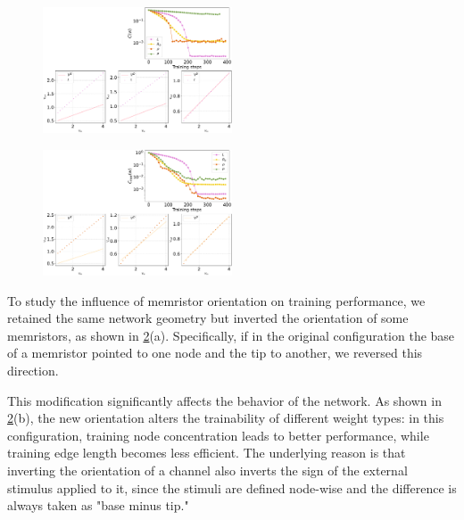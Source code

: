\documentclass[reprint,superscriptaddress,prb,showkeys]{revtex4-2}
\begin{document}
\begin{figure}[h]
    \centering
    \includegraphics[width=0.5\textwidth]{plots/regression/G00010001.pdf}
    \caption{}\label{fig:lin_regr1}
\end{figure} 

\begin{figure}[h]
    \centering
    \includegraphics[width=0.5\textwidth]{plots/regression/G00010002.pdf}
    \caption{}\label{fig:lin_regr2}
\end{figure} 


To study the influence of memristor orientation on training performance, we retained the same network geometry but inverted the orientation of some memristors, as shown in \cref{fig:lin_regr2}(a). Specifically, if in the original configuration the base of a memristor pointed to one node and the tip to another, we reversed this direction.

This modification significantly affects the behavior of the network. As shown in \cref{fig:lin_regr2}(b), the new orientation alters the trainability of different weight types: in this configuration, training node concentration leads to better performance, while training edge length becomes less efficient. The underlying reason is that inverting the orientation of a channel also inverts the sign of the external stimulus applied to it, since the stimuli are defined node-wise and the difference is always taken as "base minus tip."
\end{document}
